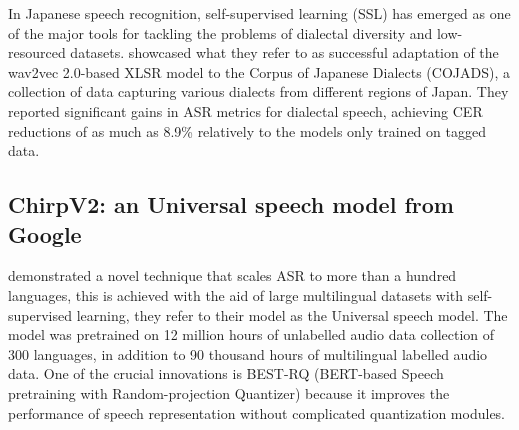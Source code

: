 In Japanese speech recognition, self-supervised learning (SSL) has emerged as one of the major tools for tackling the problems of dialectal diversity and low-resourced datasets. \textcite{miwa2023dialect} showcased what they refer to as successful adaptation of the wav2vec 2.0-based XLSR model to the Corpus of Japanese Dialects (COJADS), a collection of data capturing various dialects from different regions of Japan. They reported significant gains in ASR metrics for dialectal speech, achieving CER reductions of as much as 8.9\% relatively to the models only trained on tagged data. 


\subsection{ChirpV2: an Universal speech model from Google}
\textcite{zhang2023google} demonstrated a novel technique that scales ASR to more than a hundred languages, this is achieved with the aid of large multilingual datasets with self-supervised learning, they refer to their model as the Universal speech model. The model was pretrained on 12 million hours of unlabelled audio data collection of 300 languages, in addition to 90 thousand hours of multilingual labelled audio data. One of the crucial innovations is BEST-RQ (BERT-based Speech pretraining with Random-projection Quantizer) because it improves the performance of speech representation without complicated quantization modules. 

